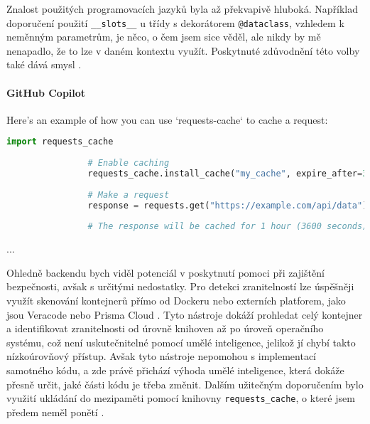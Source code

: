 \documentclass[FM,DP]{tulthesis}
\begin{document}
		Znalost použitých programovacích jazyků byla až překvapivě hluboká. Například doporučení použití \verb|__slots__| u třídy s dekorátorem \verb|@dataclass|, vzhledem k neměnným parametrům, je něco, o čem jsem sice věděl, ale nikdy by mě nenapadlo, že to lze v daném kontextu využít. Poskytnuté zdůvodnění této volby také dává smysl \cite{dataclass}.
		
		\vspace{0.6em}
		\begin{tcolorbox}[colback=white,colframe=black,title=Úprava výkonnosti třídy v Pythonu]
			\paragraph{GitHub Copilot}
			Here's an example of how you can use `requests-cache` to cache a request:
			
			\begin{lstlisting}[language=Python]
				import requests_cache
				
				# Enable caching
				requests_cache.install_cache("my_cache", expire_after=3600)
				
				# Make a request
				response = requests.get("https://example.com/api/data")
				
				# The response will be cached for 1 hour (3600 seconds)
			\end{lstlisting}
			... \cite{requests_cache}
		\end{tcolorbox}
		
		Ohledně backendu bych viděl potenciál v poskytnutí pomoci při zajištění bezpečnosti, avšak s určitými nedostatky. Pro detekci zranitelností lze úspěšněji využít skenování kontejnerů přímo od Dockeru nebo externích platforem, jako jsou Veracode nebo Prisma Cloud \cite{veracode} \cite{prisma_cloud}. Tyto nástroje dokáží prohledat celý kontejner a identifikovat zranitelnosti od úrovně knihoven až po úroveň operačního systému, což není uskutečnitelné pomocí umělé inteligence, jelikož jí chybí takto nízkoúrovňový přístup. Avšak tyto nástroje nepomohou s implementací samotného kódu, a zde právě přichází výhoda umělé inteligence, která dokáže přesně určit, jaké části kódu je třeba změnit. Dalším užitečným doporučením bylo využití ukládání do mezipaměti pomocí knihovny \verb|requests_cache|, o které jsem předem neměl ponětí \cite{webapp_basics} \cite{middleware}.
		
\end{document}
